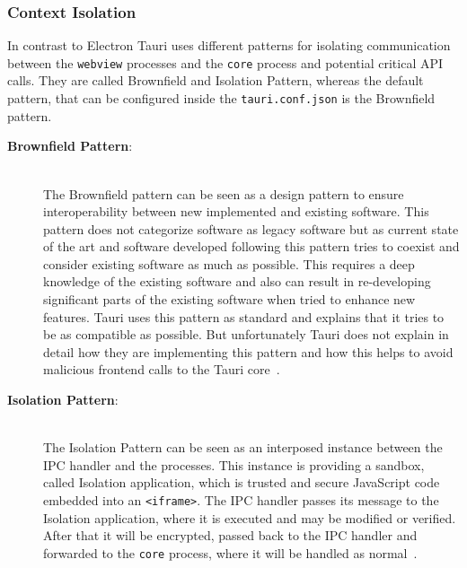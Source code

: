 \subsubsection{Context Isolation}
In contrast to Electron Tauri uses different patterns for isolating communication between the \texttt{webview} processes and the \texttt{core} process and potential critical \ac{API} calls.
They are called Brownfield and Isolation Pattern, whereas the default pattern, that can be configured inside the \texttt{tauri.conf.json} is the Brownfield pattern.
\begin{description}
    \item[\textbf{Brownfield Pattern}:] \hfill \\
    The Brownfield pattern can be seen as a design pattern to ensure interoperability between new implemented and existing software.
    This pattern does not categorize software as legacy software but as current state of the art and software developed following this pattern tries to coexist and consider existing software as much as possible.
    This requires a deep knowledge of the existing software and also can result in re-developing significant parts of the existing software when tried to enhance new features.
    Tauri uses this pattern as standard and explains that it tries to be as compatible as possible.
    But unfortunately Tauri does not explain in detail how they are implementing this pattern and how this helps to avoid malicious frontend calls to the Tauri core~\cite{tauri}.
    \item[\textbf{Isolation Pattern}:] \hfill \\
    The Isolation Pattern can be seen as an interposed instance between the \ac{IPC} handler and the processes.
    This instance is providing a sandbox, called Isolation application, which is trusted and secure JavaScript code embedded into an \texttt{<iframe>}.
    The \ac{IPC} handler passes its message to the Isolation application, where it is executed and may be modified or verified.
    After that it will be encrypted, passed back to the \ac{IPC} handler and forwarded to the \texttt{core} process, where it will be handled as normal~\cite{tauri}.


\end{description}

